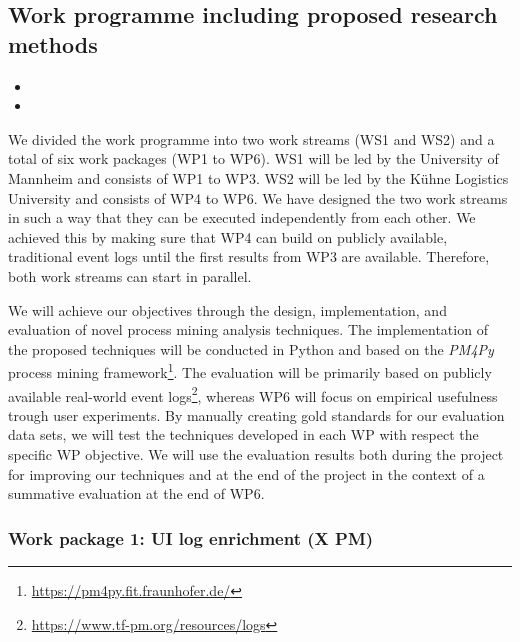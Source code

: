 \subsection{Work programme including proposed research methods}

\begin{itemize}
\item {}
\item {}
\end{itemize}

 We divided the work programme into two work streams (WS1 and WS2) and a total of six work packages (WP1 to WP6). WS1 will be led by the University of Mannheim and consists of WP1 to WP3. WS2 will be led by the Kühne Logistics University and consists of WP4 to WP6. We have designed the two work streams in such a way that they can be executed independently from each other. We achieved this by making sure that WP4 can build on publicly available, traditional event logs until the first results from WP3 are available. Therefore, both work streams can start in parallel. 

 We will achieve our objectives through the design, implementation, and evaluation of novel process mining analysis techniques. The implementation of the proposed techniques will be conducted in Python and based on the \textit{PM4Py} process mining framework\footnote{\url{https://pm4py.fit.fraunhofer.de/}}. The evaluation will be primarily based on publicly available real-world event logs\footnote{\url{https://www.tf-pm.org/resources/logs}}, whereas WP6 will focus on empirical usefulness trough user experiments. By manually creating gold standards for our evaluation data sets, we will test the techniques developed in each WP with respect the specific WP objective. We will use the evaluation results both during the project for improving our techniques and at the end of the project in the context of a summative evaluation at the end of WP6. 
 
\subsubsection{Work package 1: UI log enrichment (X PM)}
\label{sec:wp1}

